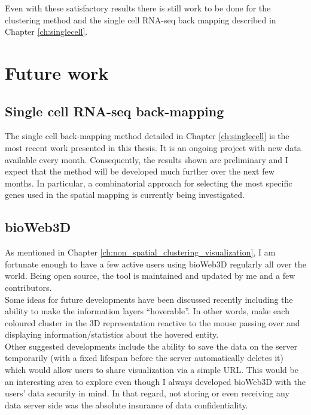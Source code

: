  
  Even with these satisfactory results there is still work to be done for the clustering method and the single cell RNA-seq back mapping described in Chapter \ref{ch:singlecell}.\\
  
\section{Future work}


  \subsection{Single cell RNA-seq back-mapping}
  The single cell back-mapping method detailed in Chapter \ref{ch:singlecell} is the most recent work presented in this thesis. It is an ongoing project with new data available every month. Consequently, the results shown are preliminary and I expect that the method will be developed much further over the next few months. In particular, a combinatorial approach for selecting the most specific genes used in the spatial mapping is currently being investigated.
  
  \subsection{bioWeb3D}
  As mentioned in Chapter \ref{ch:non_spatial_clustering_visualization}, I am fortunate enough to have a few active users using bioWeb3D regularly all over the world. Being open source, the tool is maintained and updated by me and a few contributors.\\
  
   Some ideas for future developments have been discussed recently including the ability to make the information layers ``hoverable''. In other words, make each coloured cluster in the 3D representation reactive to the mouse passing over and displaying information/statistics about the hovered entity.\\
   
   Other suggested developments include the ability to save the data on the server temporarily (with a fixed lifespan before the server automatically deletes it) which would allow users to share visualization via a simple URL. This would be an interesting area to explore even though I always developed bioWeb3D with the users' data security in mind. In that regard, not storing or even receiving any data server side was the absolute insurance of data confidentiality.\\
   
